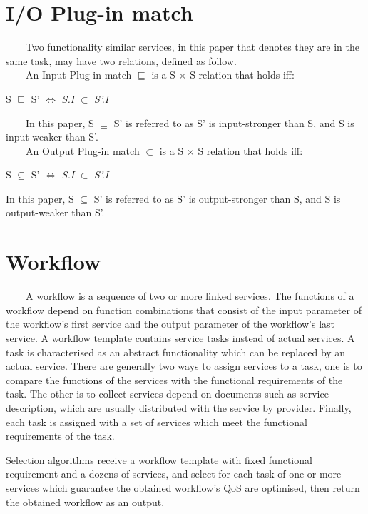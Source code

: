 \documentclass[senior,final,11pt]{iscs-thesis}
\begin{document}
\section{I/O Plug-in match}
~~~~Two functionality similar services, in this paper that denotes they are in the same task, may have two relations, defined as follow.\\
~~~~An Input Plug-in match $\sqsubseteq$ is a S $\times$ S relation that holds iff:
\begin{center}
S $\sqsubseteq$ S'  $\Leftrightarrow$ {\em S.I} $\subset$ {\em S'.I}
\end{center}
~~~~In this paper, S $\sqsubseteq$ S' is referred to as S' is input-stronger than S, and S is input-weaker than S'.\\
~~~~An Output Plug-in match $\subset$ is a S $\times$ S relation that holds iff:
\begin{center}
S $\subseteq$ S' $\Leftrightarrow$ {\em S.I} $\subset$ {\em S'.I}
\end{center}

In this paper, S $\subseteq$ S' is referred to as S' is output-stronger than S, and S is output-weaker than S'.\\



\section{Workflow}
~~~~A workflow is a sequence of two or more linked services. The functions of a workflow depend on function combinations that consist of the input parameter of the workflow's first service and the output parameter of the workflow's last service. A workflow template contains service tasks instead of actual services. A task is characterised as an abstract functionality which can be replaced by an actual service. There are generally two ways to assign services to a task, one is to compare the functions of the services with the functional requirements of the task. The other is to collect services depend on documents such as service description, which are usually distributed with the service by provider. Finally, each task is assigned with a set of services which meet the functional requirements of the task.

Selection algorithms receive a workflow template with fixed functional requirement and a dozens of services, and select for each task of one or more services which guarantee the obtained workflow's QoS are optimised, then return the obtained workflow as an output.
\end{document}
